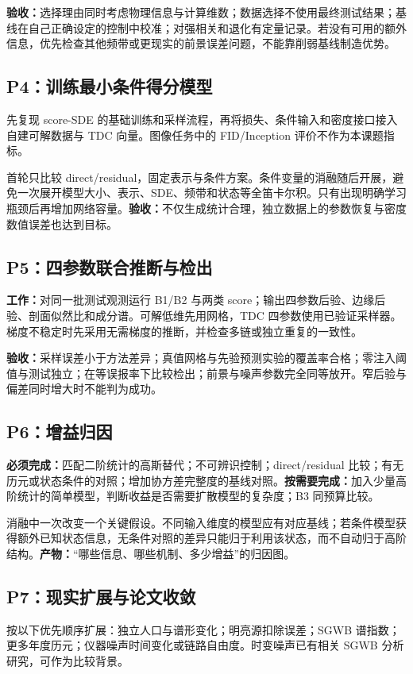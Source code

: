 \documentclass[UTF8,fontset=fandol,a4paper,11pt]{ctexart}
\numberwithin{equation}{section}
\begin{document}
\textbf{验收：}选择理由同时考虑物理信息与计算维数；数据选择不使用最终测试结果；基线在自己正确设定的控制中校准；对强相关和退化有定量记录。若没有可用的额外信息，优先检查其他频带或更现实的前景误差问题，不能靠削弱基线制造优势。

\subsection{P4：训练最小条件得分模型}
先复现 score-SDE 的基础训练和采样流程，再将损失、条件输入和密度接口接入自建可解数据与 TDC 向量\cite{reproduction}。图像任务中的 FID/Inception 评价不作为本课题指标。

首轮只比较 direct/residual，固定表示与条件方案。条件变量的消融随后开展，避免一次展开模型大小、表示、SDE、频带和状态等全笛卡尔积。只有出现明确学习瓶颈后再增加网络容量。\textbf{验收：}不仅生成统计合理，独立数据上的参数恢复与密度数值误差也达到目标。

\subsection{P5：四参数联合推断与检出}
\textbf{工作：}对同一批测试观测运行 B1/B2 与两类 score；输出四参数后验、边缘后验、剖面似然比和成分谱。可解低维先用网格，TDC 四参数使用已验证采样器。梯度不稳定时先采用无需梯度的推断，并检查多链或独立重复的一致性。

\textbf{验收：}采样误差小于方法差异；真值网格与先验预测实验的覆盖率合格；零注入阈值与测试独立；在等误报率下比较检出；前景与噪声参数完全同等放开。窄后验与偏差同时增大时不能判为成功。

\subsection{P6：增益归因}
\textbf{必须完成：}匹配二阶统计的高斯替代；不可辨识控制；direct/residual 比较；有无历元或状态条件的对照；增加协方差完整度的基线对照。\textbf{按需要完成：}加入少量高阶统计的简单模型，判断收益是否需要扩散模型的复杂度；B3 同预算比较。

消融中一次改变一个关键假设。不同输入维度的模型应有对应基线；若条件模型获得额外已知状态信息，无条件对照的差异只能归于利用该状态，而不自动归于高阶结构。\textbf{产物：}“哪些信息、哪些机制、多少增益”的归因图。

\subsection{P7：现实扩展与论文收敛}
按以下优先顺序扩展：独立人口与谱形变化；明亮源扣除误差；SGWB 谱指数；更多年度历元；仪器噪声时间变化或链路自由度。时变噪声已有相关 SGWB 分析研究，可作为比较背景\cite{timenoise}。
\end{document}
